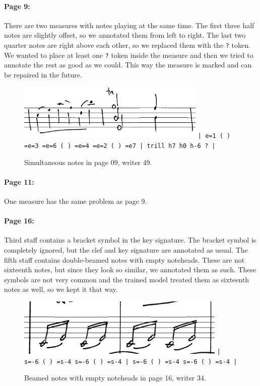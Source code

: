 \paragraph{Page 9:} There are two measures with notes playing at the same time. The first three half notes are slightly offset, so we annotated them from left to right. The last two quarter notes are right above each other, so we replaced them with the \verb`?` token. We wanted to place at least one \verb`?` token inside the measure and then we tried to annotate the rest as good as we could. This way the measure is marked and can be repaired in the future.

\begin{figure}[h]
    \centering
    \includegraphics[width=90mm]{../img/ae-09}
    \verb`| e=1 ( ) =e=3 =e=6 ( ) =e=4 =e=2 ( ) =e7 | trill h7 h0 h-6 ? |`
    \caption{Simultaneous notes in page 09, writer 49.}
    \label{fig6:AnnotationExperience09}
\end{figure}

\paragraph{Page 11:} One measure has the same problem as page 9.

\paragraph{Page 16:} Third staff contains a bracket symbol in the key signature. The bracket symbol is completely ignored, but the clef and key signature are annotated as usual. The fifth staff contains double-beamed notes with empty noteheads. These are not sixteenth notes, but since they look so similar, we annotated them as such. These symbols are not very common and the trained model treated them as sixteenth notes as well, so we kept it that way.

\begin{figure}[h]
    \centering
    \includegraphics[width=100mm]{../img/ae-16}
    \verb`| s=-6 ( ) =s-4 s=-6 ( ) =s-4 | s=-6 ( ) =s-4 s=-6 ( ) =s-4 |`
    \caption{Beamed notes with empty noteheads in page 16, writer 34.}
    \label{fig6:AnnotationExperience16}
\end{figure}

